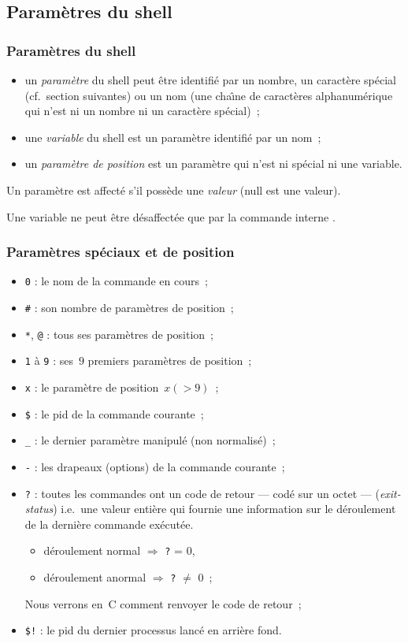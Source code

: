 \subsection{Param\`etres du shell}
\begin{frame}
\frametitle{Param\`etres du shell}
  \begin{itemize}
  \item un \emph{param\`etre} du shell peut \^etre identifi\'e par un
    nombre, un caract\`ere sp\'ecial (cf.\ section suivantes) ou un
    nom (une cha\^\i{}ne de caract\`eres alphanum\'erique qui n'est ni
    un nombre ni un caract\`ere sp\'ecial)~;
  \item une \emph{variable} du shell est un param\`etre identifi\'e
    par un nom~;
  \item un \emph{param\`etre de position} est un param\`etre qui n'est
    ni sp\'ecial ni une variable.
  \end{itemize}
  Un param\`etre est affect\'e s'il poss\`ede une \emph{valeur} (null
  est une valeur).
  \par\medskip
  Une variable ne peut \^etre d\'esaffect\'ee que par la commande
  interne .
\end{frame}
\begin{frame}[fragile]
  \frametitle{Param\`etres sp\'eciaux et de position}%
  \begin{itemize}
  \item \verb|0| : le nom de la commande en cours~;
  \item \verb|#| : son nombre de param\`etres de position~;
  \item \verb|*|, \verb|@| : tous ses param\`etres de position~;
  \item \verb|1| \`a \verb|9| : ses~$9$ premiers param\`etres de
    position~;
  \item \verb|x| : le param\`etre de position~$x(>9)$~;
  \item \verb|$| : le pid de la commande courante~;
  \item \verb|_| : le dernier param\`etre manipul\'e (non
    normalis\'e)~;
  \item \verb|-| : les drapeaux (options) de la commande courante~;
  \item \verb|?| : toutes les commandes ont un code de retour ---
    cod\'e sur un octet --- (\emph{exit-status}) i.e.\ une valeur
    enti\`ere qui fournie une information sur le d\'eroulement de la
    derni\`ere commande ex\'ecut\'ee.
    \begin{itemize}
    \item d\'eroulement normal $\Rightarrow{}$ \verb|?| = 0,
    \item d\'eroulement anormal $\Rightarrow{}$ \verb|?| $\neq$ 0~;
    \end{itemize}
    Nous verrons en~C comment renvoyer le code de retour~;
  \item \verb|$!| : le pid du dernier processus lanc\'e en arri\`ere
    fond.
  \end{itemize}
\end{frame}
